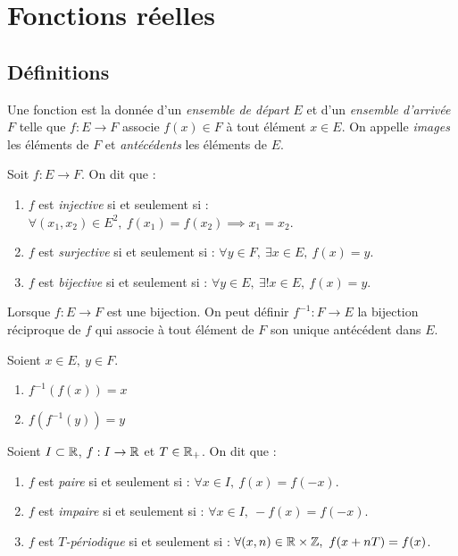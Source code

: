 \chapter{Fonctions réelles}

\section{Définitions}
\begin{definition}[Fonction]
	Une fonction est la donnée d'un \emph{ensemble de départ} $E$ et d'un \emph{ensemble d'arrivée} $F$ telle que 
	$ f : E \to F $
	associe $f(x) \in F$ à tout élément $x \in E$.
	On appelle \emph{images} les éléments de $F$ et \emph{antécédents} les éléments de $E$.
\end{definition}

\begin{definition}
	Soit $f : E \to F$. On dit que :
    \begin{enumerate}
        \item $f$ est \emph{injective} si et seulement si : $\forall (x_1, x_2) \in E^2,\ f(x_1) = f(x_2) \implies x_1 = x_2$.
        \item $f$ est \emph{surjective} si et seulement si : $\forall y \in F,\ \exists x \in E,\ f(x) = y$.
        \item $f$ est \emph{bijective} si et seulement si : $\forall y \in E,\ \exists ! x \in E,\ f(x) = y$.
    \end{enumerate}
\end{definition}

\begin{definition}
	Lorsque $f : E \to F$ est une bijection. On peut définir $f^{-1} : F \to E$ la bijection réciproque de $f$ qui associe à tout élément de $F$ son unique antécédent dans $E$.
\end{definition}

\begin{proposition}
	Soient $x \in E,\ y \in F$.
    \begin{multicols}{2}
        \begin{enumerate}
            \item $f^{-1} (f(x)) = x$
            \item $f(f^{-1}(y)) = y$
        \end{enumerate}
    \end{multicols}
\end{proposition}

\begin{definition}
	Soient $I \subset \mathbb{R}$, $f : I \to \mathbb{R}$ et $T \in \mathbb{R}_+$. On dit que :
    \begin{enumerate}
        \item $f$ est \emph{paire} si et seulement si : $\forall x \in I,\ f(x) = f(-x)$.
        \item $f$ est \emph{impaire} si et seulement si : $\forall x \in I,\ -f(x) = f(-x)$.
        \item $f$ est \emph{$T$-périodique} si et seulement si : $\forall (x,n) \in \mathbb{R} \times \mathbb{Z},\ f(x + nT) = f(x)$.
    \end{enumerate}
\end{definition}

